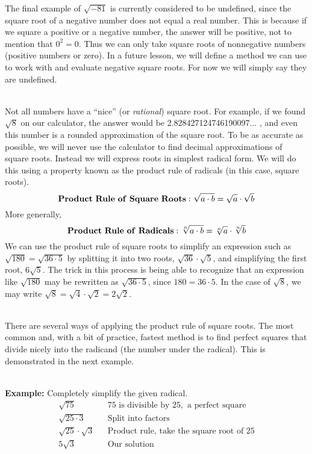\documentclass[12pt]{article}
\theoremstyle{definition}
\begin{document}
The final example of $\sqrt{- 81}$ is currently considered to be undefined, since the square root of a negative number does not equal a real number. This is because if we square a positive or a negative number, the answer will be positive, not to mention that $0^2=0$. Thus we can only take square roots of nonnegative numbers (positive numbers or zero).  In a future lesson, we will define a method we can use to work with and evaluate negative square roots.  For now we will simply say they are undefined.\\
\ \par
Not all numbers have a ``nice'' (or {\it rational}) square root. For example, if we found
$\sqrt{8}$ on our calculator, the answer would be
2.828427124746190097...%
, and even this number is a rounded approximation of the square root. To be as accurate as possible, we will never
use the calculator to find decimal approximations of square roots. Instead we will express roots in simplest radical form. We will do this using a property known as the product rule of radicals (in this case, square roots).
\[ {\bf Product \ Rule \ of \ Square \ Roots: \ }
   \sqrt{a \cdot b} = \sqrt{a} \cdot \sqrt{b} \]
More generally,
\[ {\bf Product \ Rule \ of \ Radicals: \ }
   \sqrt[n]{a \cdot b} = \sqrt[n]{a} \cdot \sqrt[n]{b} \]
We can use the product rule of square roots to simplify an expression such as $\sqrt{180}=\sqrt{36 \cdot
5}$ by splitting it into two roots, $\sqrt{36} \cdot \sqrt{5}$, and simplifying the first root, $6 \sqrt{5}$. The trick in this process is being able to recognize that an expression like $\sqrt{180}$ may be rewritten as $\sqrt{36 \cdot 5}$, since $180=36\cdot 5$. In the case of $\sqrt{8}$, we may write $\sqrt{8}=\sqrt{4}\cdot\sqrt{2}=2\sqrt{2}$.\\
\ \par
There are several ways of applying the product rule of square roots. The most common and, with a bit of practice, fastest method is to find perfect squares that divide nicely into the radicand (the number under the radical). This is demonstrated in the next example.\\
\ \par
{\bf Example:} Completely simplify the given radical.
  \begin{eqnarray*}
    \sqrt{75} &  & 75 \text{\ is divisible by \ } 25, 
    \text{\ a perfect square \ }\\
    \sqrt{25 \cdot 3} &  & \text{Split into factors}\\
    \sqrt{25} \cdot \sqrt{3} &  & \text{Product rule, take the square root of \ } 25\\
    5 \sqrt{3} &  & \text{Our solution}
  \end{eqnarray*}
\end{document}
